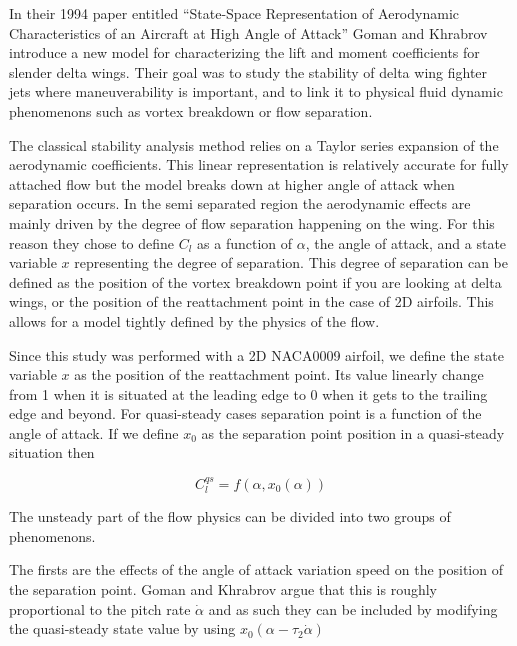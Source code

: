 
In their 1994 paper entitled ``State-Space Representation of Aerodynamic Characteristics of an Aircraft at High Angle of Attack'' \cite{GK} Goman and Khrabrov introduce a new model for characterizing the lift and moment coefficients for slender delta wings.
Their goal was to study the stability of delta wing fighter jets where maneuverability is important, and to link it to physical fluid dynamic phenomenons such as vortex breakdown or flow separation.

\par The classical stability analysis method relies on a Taylor series expansion of the aerodynamic coefficients.
This linear representation is relatively accurate for fully attached flow but the model breaks down at higher angle of attack when separation occurs.
In the semi separated region the aerodynamic effects are mainly driven by the degree of flow separation happening on the wing.
For this reason they chose to define $C_l$ as a function of $\alpha$, the angle of attack, and a state variable $x$ representing the degree of separation.
This degree of separation can be defined as the position of the vortex breakdown point if you are looking at delta wings, or the position of the reattachment point in the case of 2D airfoils.
This allows for a model tightly defined by the physics of the flow.


Since this study was performed with a 2D NACA0009 airfoil, we define the state variable $x$ as the position of the reattachment point.
Its value linearly change from 1 when it is situated at the leading edge to 0 when it gets to the trailing edge and beyond.
For quasi-steady cases separation point is a function of the angle of attack. If we define $x_0$ as the separation point position in a quasi-steady situation then

\begin{equation}
	C_l^{qs} = f(\alpha,x_0(\alpha))
	\label{eqn:qs_Cl}
\end{equation}

The unsteady part of the flow physics can be divided into two groups of phenomenons.

\par The firsts are the effects of the angle of attack variation speed on the position of the separation point.
Goman and Khrabrov argue that this is roughly proportional to the pitch rate $\dot{\alpha}$ and as such they can be included by modifying the quasi-steady state value by using $x_0 (\alpha - \tau_2 \dot{\alpha})$ 

